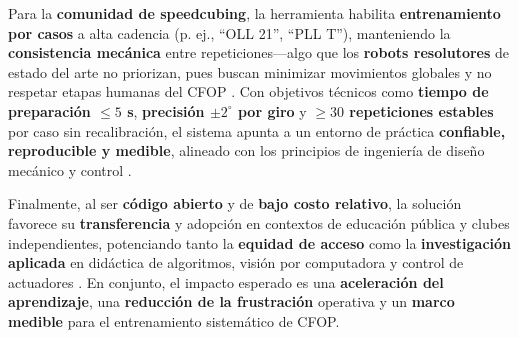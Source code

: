 Para la \textbf{comunidad de speedcubing}, la herramienta habilita \textbf{entrenamiento por casos} a alta cadencia (p. ej., ``OLL 21'', ``PLL T''), manteniendo la \textbf{consistencia mecánica} entre repeticiones---algo que los \textbf{robots resolutores} de estado del arte no priorizan, pues buscan minimizar movimientos globales y no respetar etapas humanas del CFOP \cite{kociemba1992two,rokicki2014diameter}. 
Con objetivos técnicos como \textbf{tiempo de preparación $\leq 5$ s}, \textbf{precisión $\pm 2^\circ$ por giro} y \textbf{$\geq 30$ repeticiones estables} por caso sin recalibración, el sistema apunta a un entorno de práctica \textbf{confiable, reproducible y medible}, alineado con los principios de ingeniería de diseño mecánico y control \cite{budynas2011shigley,shigley2004handbook}.

Finalmente, al ser \textbf{código abierto} y de \textbf{bajo costo relativo}, la solución favorece su \textbf{transferencia} y adopción en contextos de educación pública y clubes independientes, potenciando tanto la \textbf{equidad de acceso} como la \textbf{investigación aplicada} en didáctica de algoritmos, visión por computadora y control de actuadores \cite{guerrero2023educational,aljuboori2022application}. 
En conjunto, el impacto esperado es una \textbf{aceleración del aprendizaje}, una \textbf{reducción de la frustración} operativa y un \textbf{marco medible} para el entrenamiento sistemático de CFOP.
